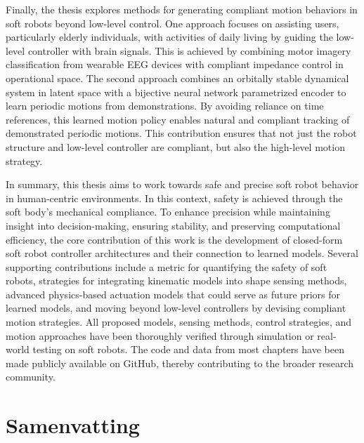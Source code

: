 Finally, the thesis explores methods for generating compliant motion behaviors in soft robots beyond low-level control. One approach focuses on assisting users, particularly elderly individuals, with activities of daily living by guiding the low-level controller with brain signals. This is achieved by combining motor imagery classification from wearable EEG devices with compliant impedance control in operational space. The second approach combines an orbitally stable dynamical system in latent space with a bijective neural network parametrized encoder to learn periodic motions from demonstrations. By avoiding reliance on time references, this learned motion policy enables natural and compliant tracking of demonstrated periodic motions. This contribution ensures that not just the robot structure and low-level controller are compliant, but also the high-level motion strategy.

In summary, this thesis aims to work towards safe and precise soft robot behavior in human-centric environments. In this context, safety is achieved through the soft body’s mechanical compliance. To enhance precision while maintaining insight into decision-making, ensuring stability, and preserving computational efficiency, the core contribution of this work is the development of closed-form soft robot controller architectures and their connection to learned models.
Several supporting contributions include a metric for quantifying the safety of soft robots, strategies for integrating kinematic models into shape sensing methods, advanced physics-based actuation models that could serve as future priors for learned models, and moving beyond low-level controllers by devising compliant motion strategies. All proposed models, sensing methods, control strategies, and motion approaches have been thoroughly verified through simulation or real-world testing on soft robots. The code and data from most chapters have been made publicly available on GitHub, thereby contributing to the broader research community. 


\chapter*{Samenvatting}

